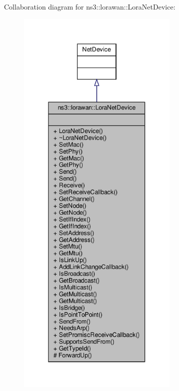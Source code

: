 Collaboration diagram for ns3\+:\+:lorawan\+:\+:Lora\+Net\+Device\+:
\nopagebreak
\begin{figure}[H]
\begin{center}
\leavevmode
\includegraphics[height=550pt]{classns3_1_1lorawan_1_1LoraNetDevice__coll__graph}
\end{center}
\end{figure}
